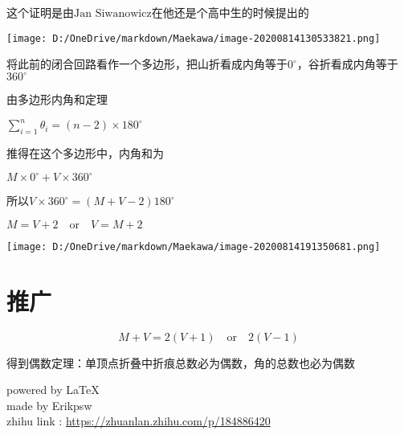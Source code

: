 \documentclass[a4paper,12pt]{article}
\begin{document}
这个证明是由$\text{Jan Siwanowicz}$在他还是个高中生的时候提出的
\begin{center}
\texttt{[image: D:/OneDrive/markdown/Maekawa/image-20200814130533821.png]}\\
\end{center}

将此前的闭合回路看作一个多边形，把山折看成内角等于$0^{\circ}$，谷折看成内角等于$360^{\circ}$

由多边形内角和定理

$\sum\limits_{i=1}^n\theta_i=(n-2)×180^{\circ}$

推得在这个多边形中，内角和为

$M \times 0^{\circ} +V \times 360^{\circ}$

所以$V\times 360^{\circ} = (M +V-2)180^{\circ}$

$ M = V +2 \quad \text{or}\quad V = M + 2$
\begin{center}
\texttt{[image: D:/OneDrive/markdown/Maekawa/image-20200814191350681.png]}\\
\end{center}

\section{推广}
\begin{equation}\label{3}
    M + V = 2(V+1) \quad \text{or} \quad2(V- 1)
    \end{equation}

得到偶数定理：单顶点折叠中折痕总数必为偶数，角的总数也必为偶数
\begin{flushright}
    powered by \LaTeX\\
    made by Erikpsw\\ 
    zhihu link : \url{https://zhuanlan.zhihu.com/p/184886420}
\end{flushright}



\end{document}
